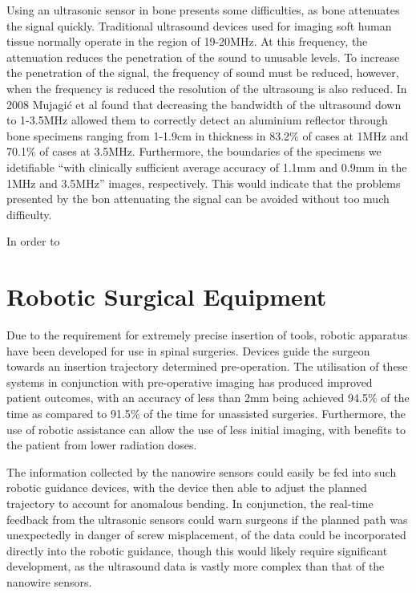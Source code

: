 \documentclass[conference, a4paper]{IEEEtran}
\begin{document}
Using an ultrasonic sensor in bone presents some difficulties, as bone attenuates
the signal quickly. Traditional ultrasound devices used for imaging soft
human tissue normally operate in the region of 19-20MHz. At this frequency,
the attenuation reduces the penetration of the sound to unusable levels\cite{Laugier2011}.
To increase the penetration of the signal, the frequency of sound must be reduced, however,
when the frequency is reduced the resolution of the ultrasoung is also reduced. In 2008 Mujagić
et al found that decreasing the bandwidth of the ultrasound down to 1-3.5MHz allowed them to
correctly detect an aluminium reflector through bone specimens ranging from 1-1.9cm in thickness in
83.2$\%$ of cases at 1MHz and 70.1$\%$ of cases at 3.5MHz. Furthermore, the boundaries
of the specimens we idetifiable ``with clinically sufficient average accuracy of 1.1mm and 0.9mm in the 1MHz
and 3.5MHz'' images, respectively\cite{Mujagic2008}. This would indicate that the 
problems presented by the bon attenuating the signal can be avoided without too much
difficulty.

In order to


\section{Robotic Surgical Equipment}
Due to the requirement for extremely precise insertion of tools, robotic apparatus have been
developed for use in spinal surgeries. Devices guide the surgeon towards an insertion trajectory
determined pre-operation\cite{Hu2012}. The utilisation of these systems in conjunction with pre-operative
imaging has produced improved patient outcomes, with an accuracy of less than 2mm being
achieved 94.5$\%$ of the time as compared to 91.5$\%$ of the time for unassisted surgeries\cite{Kantelhardt2011}.
Furthermore, the use of robotic assistance can allow the use of less initial imaging, with benefits
to the patient from lower radiation doses.

The information collected by the nanowire sensors could easily be fed into such robotic guidance
devices, with the device then able to adjust the planned trajectory to account for anomalous
bending. In conjunction, the real-time feedback from the ultrasonic sensors could warn surgeons
if the planned path was unexpectedly in danger of screw misplacement, of the data could be
incorporated directly into the robotic guidance, though this would likely require significant
development, as the ultrasound data is vastly more complex than that of the nanowire sensors.
\end{document}
